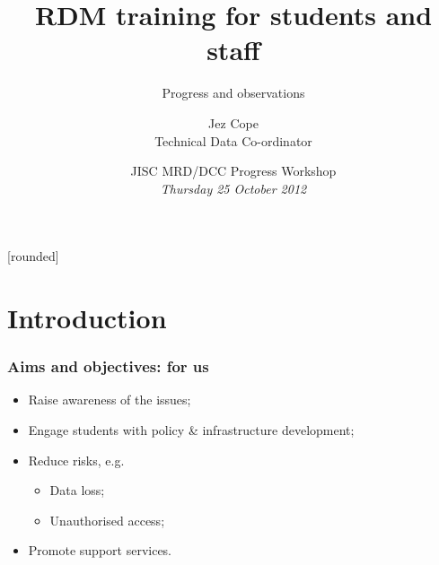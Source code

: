 \usepackage{ccicons}
\usepackage{booktabs}

\newcommand{\shorturl}[2]%
  [?utm\_source=jsc\&utm\_medium=presentation\&utm\_campaign=jiscmrd\_workshop\_oct\_2012]%
  {\href{http://#2#1}{\nolinkurl{#2}}}


[rounded]


\title{RDM training for students and staff}
\subtitle{Progress and observations}
\author[Jez Cope]{Jez Cope\\ Technical Data Co-ordinator}
\date[25 October 2012]{JISC MRD/DCC Progress Workshop\\ \textit{Thursday 25 October 2012}}




\begin{frame}[plain]
  \titlepage
\end{frame}

\begin{frame}
  \tableofcontents
\end{frame}

\section{Introduction}

\begin{frame}
  \frametitle{Aims and objectives: for us}
  
  \begin{itemize}[<+>]
    \item Raise awareness of the issues;
    \item Engage students with policy \& infrastructure development;
    \item Reduce risks, e.g.
      \begin{itemize}[<.>]
        \item Data loss;
        \item Unauthorised access;
      \end{itemize}
    \item Promote support services.
  \end{itemize}

\end{frame}

